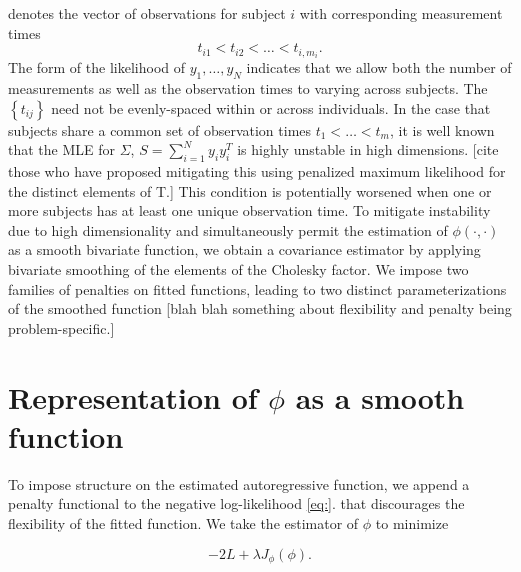 \documentclass[12pt]{article}
\theoremstyle{definition}
\begin{document}
\noindent
denotes the vector of observations for subject $i$ with corresponding measurement times 
\[
t_{i1} < t_{i2} < \dots < t_{i,m_i}.
\]
The form of the likelihood of $y_1,\dots,y_N$ indicates that we allow both the number of measurements as well as the observation times to varying across subjects. The $\left\{t_{ij} \right\}$ need not be evenly-spaced within or across individuals.  In the case that subjects share a common set of observation times $t_1 < \dots < t_m$,  it is well known that the MLE for $\Sigma$, $S = \sum_{i=1}^N y_i y_i^T$ is highly unstable in high dimensions. [cite those who have proposed mitigating this using penalized maximum likelihood for the distinct elements of T.] This condition is potentially worsened when one or more subjects has at least one unique observation time. To mitigate instability due to high dimensionality and simultaneously permit the estimation of $\phi\left(\cdot,\cdot\right)$ as a smooth bivariate function, we obtain a covariance estimator by applying bivariate smoothing of the elements of the Cholesky factor. We impose two families of penalties on fitted functions, leading to two distinct parameterizations of the smoothed function [blah blah something about flexibility and penalty being problem-specific.]  


\section{Representation of $\phi$ as a smooth function}

To impose structure on the estimated autoregressive function, we append a penalty functional to the negative log-likelihood \ref{eq:}. that discourages the flexibility of the fitted function. We take the estimator of $\phi$ to minimize

\begin{equation} 
 -2 L + \lambda J_{\phi}\left(\phi\right)  \label{eq:phi-objective-fnc}.
\end{equation}
\end{document}
